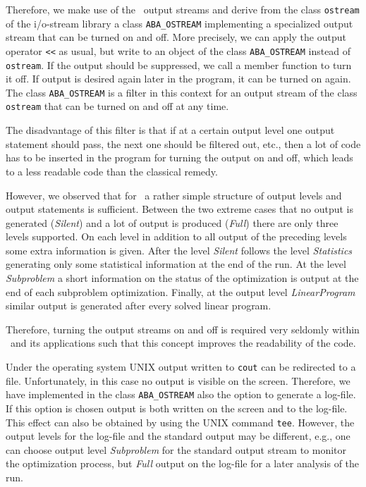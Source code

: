 Therefore, we make use of the \CPLUSPLUS\ output streams and derive
from the class {\tt ostream} of the i/o-stream library
a class {\tt ABA\_OSTREAM} implementing a specialized output stream
that can be turned on and off. More precisely, we can 
apply the output operator {\tt <<} as usual, but write to an object of
the class {\tt ABA\_OSTREAM} instead of {\tt ostream}.
If the output should be suppressed, we call a member function to 
turn it off. If output is desired again later in the program,
it can be turned on again. The class {\tt ABA\_OSTREAM} is a filter 
in this context for an output
stream of the class {\tt ostream} that
can be turned on and off at any time.

The disadvantage of this filter is that if at a certain output level
one output statement should pass, the next one should be filtered out, etc.,
then a lot of code has to be inserted in the program for turning
the output on and off, which leads to a less readable code than
the classical remedy.

However, we observed that for \ABACUS\ a rather simple structure of
output levels and output statements is sufficient. Between the two
extreme cases that no output is generated ({\it Silent\/}) and a lot
of output is produced ({\it Full\/}) there are only three levels supported. 
On each level
in addition to all output of the preceding levels some extra information
is given. After the level {\it Silent\/} follows the level
{\it Statistics\/} generating only some statistical information at the
end of the run. At the level {\it Subproblem\/} a short information
on the status of the optimization is output at the end of each subproblem
optimization. Finally, at the output level {\it LinearProgram\/}
similar output is generated after every solved linear program.

Therefore, turning the output streams on and off is required very 
seldomly within \ABACUS\ and its applications such that this concept 
improves the readability of the code.

Under the operating system UNIX output written to {\tt cout}
can be redirected to a file. Unfortunately, in this case no
output is visible on the screen. Therefore, we have implemented
in the class {\tt ABA\_OSTREAM} also the option to generate a 
log-file. If this option is chosen output is both written on the
screen and to the log-file. This effect can also be obtained by
using the UNIX command {\tt tee}.
However, the output levels for the log-file
and the standard output may be different, e.g., one can choose
output level {\it Subproblem\/} for the standard output stream to monitor the
optimization process, but {\it Full\/} output on the log-file
for a later analysis of the run. 

